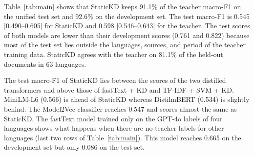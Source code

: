 \documentclass{ieeeaccess}
\begin{document}
Table~\ref{tab:main} shows that StaticKD keeps 91.1\% of the teacher macro-F1 on the unified test set and 92.6\% on the development set. The test macro-F1 is 0.545 [0.490--0.605] for StaticKD and 0.598 [0.546--0.643] for the teacher. The test scores of both models are lower than their development scores (0.761 and 0.822) because most of the test set lies outside the languages, sources, and period of the teacher training data. StaticKD agrees with the teacher on 81.1\% of the held-out documents in 63 languages.

The test macro-F1 of StaticKD lies between the scores of the two distilled transformers and above those of fastText + KD and TF-IDF + SVM + KD. MiniLM-L6 (0.566) is ahead of StaticKD whereas DistilmBERT (0.534) is slightly behind. The Model2Vec classifier reaches 0.547 and scores almost the same as StaticKD. The fastText model trained only on the GPT-4o labels of four languages shows what happens when there are no teacher labels for other languages (last two rows of Table~\ref{tab:main}). This model reaches 0.665 on the development set but only 0.086 on the test set.
\end{document}
